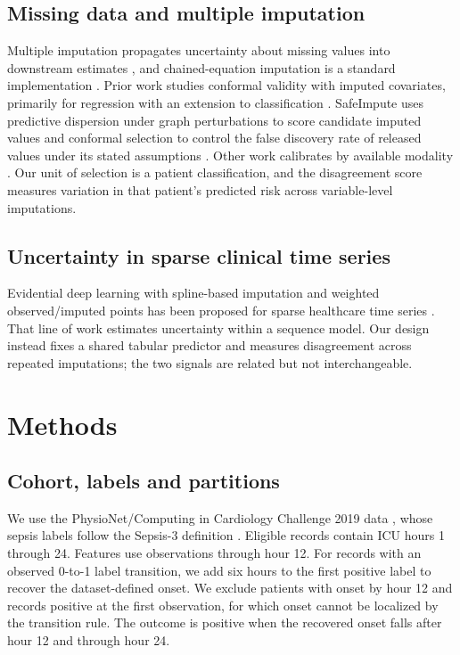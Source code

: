 \subsection{Missing data and multiple imputation}

Multiple imputation propagates uncertainty about missing values into downstream estimates \cite{rubin1987multiple,little2019statistical}, and chained-equation imputation is a standard implementation \cite{vanbuuren2011mice}. Prior work studies conformal validity with imputed covariates, primarily for regression with an extension to classification \cite{zaffran2023conformal}. SafeImpute uses predictive dispersion under graph perturbations to score candidate imputed values and conformal selection to control the false discovery rate of released values under its stated assumptions \cite{he2026safeimpute}. Other work calibrates by available modality \cite{wong2026mc2}. Our unit of selection is a patient classification, and the disagreement score measures variation in that patient's predicted risk across variable-level imputations.

\subsection{Uncertainty in sparse clinical time series}

Evidential deep learning with spline-based imputation and weighted observed/imputed points has been proposed for sparse healthcare time series \cite{vavaroutas2025squiredl}. That line of work estimates uncertainty within a sequence model. Our design instead fixes a shared tabular predictor and measures disagreement across repeated imputations; the two signals are related but not interchangeable.

\section{Methods}

\subsection{Cohort, labels and partitions}

We use the PhysioNet/Computing in Cardiology Challenge 2019 data \cite{reyna2020early,goldberger2000physiobank}, whose sepsis labels follow the Sepsis-3 definition \cite{singer2016sepsis3}. Eligible records contain ICU hours 1 through 24. Features use observations through hour 12. For records with an observed 0-to-1 label transition, we add six hours to the first positive label to recover the dataset-defined onset. We exclude patients with onset by hour 12 and records positive at the first observation, for which onset cannot be localized by the transition rule. The outcome is positive when the recovered onset falls after hour 12 and through hour 24.

